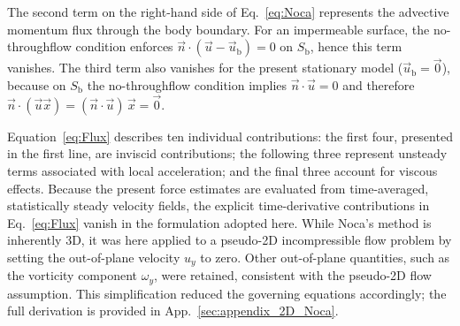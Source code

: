 \documentclass[wes, manuscript]{copernicus}
\begin{document}
The second term on the right-hand side of Eq.~\eqref{eq:Noca} represents the advective momentum flux through the body boundary. 
For an impermeable surface, the no-throughflow condition enforces $\vec{n}\cdot(\vec{u}-\vec{u}_{\textrm{b}})=0$ on $S_{\textrm{b}}$, hence this term vanishes.
The third term also vanishes for the present stationary model ($\vec{u}_{\textrm{b}}=\vec{0}$), because on $S_{\textrm{b}}$ the no-throughflow condition implies $\vec{n}\cdot\vec{u}=0$ and therefore
$\vec{n}\cdot(\vec{u}\vec{x})=(\vec{n}\cdot\vec{u})\,\vec{x}=\vec{0}$.

Equation~\eqref{eq:Flux} describes ten individual contributions: the first four, presented in the first line, are inviscid contributions; the following three represent unsteady terms associated with local acceleration; and the final three account for viscous effects. Because the present force estimates are evaluated from time-averaged, statistically steady velocity fields, the explicit time-derivative contributions in Eq.~\eqref{eq:Flux} vanish in the formulation adopted here. 
While Noca’s method is inherently 3D, it was here applied to a pseudo-2D incompressible flow problem by setting the out-of-plane velocity $u_y$ to zero. Other out-of-plane quantities, such as the vorticity component $\omega_y$, were retained, consistent with the pseudo-2D flow assumption. This simplification reduced the governing equations accordingly; the full derivation is provided in App.~\ref{sec:appendix_2D_Noca}.

\end{document}
